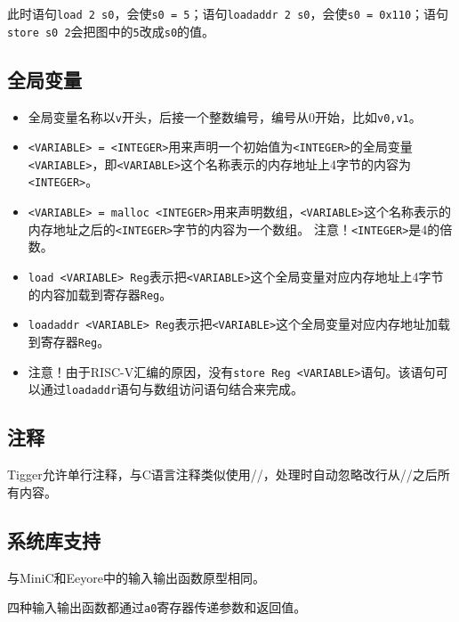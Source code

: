\documentclass{ctexart}
\begin{document}
此时语句\texttt{load 2 s0}，会使\texttt{s0 = 5}；语句\texttt{loadaddr 2 s0}，会使\texttt{s0 = 0x110}；语句\texttt{store s0 2}会把图中的\texttt{5}改成\texttt{s0}的值。

\subsection{全局变量}

\begin{itemize}
\item
全局变量名称以\texttt{v}开头，后接一个整数编号，编号从0开始，比如\texttt{v0,v1}。

\item
\texttt{<VARIABLE> = <INTEGER>}用来声明一个初始值为\texttt{<INTEGER>}的全局变量\texttt{<VARIABLE>}，即\texttt{<VARIABLE>}这个名称表示的内存地址上4字节的内容为\texttt{<INTEGER>}。

\item
\texttt{<VARIABLE> = malloc <INTEGER>}用来声明数组，\texttt{<VARIABLE>}这个名称表示的内存地址之后的\texttt{<INTEGER>}字节的内容为一个数组。
注意！\texttt{<INTEGER>}是4的倍数。


\item
\texttt{load <VARIABLE> Reg}表示把\texttt{<VARIABLE>}这个全局变量对应内存地址上4字节的内容加载到寄存器\texttt{Reg}。

\item
\texttt{loadaddr <VARIABLE> Reg}表示把\texttt{<VARIABLE>}这个全局变量对应内存地址加载到寄存器\texttt{Reg}。

\item
注意！由于RISC-V汇编的原因，没有\texttt{store Reg <VARIABLE>}语句。该语句可以通过\texttt{loadaddr}语句与数组访问语句结合来完成。
\end{itemize}

\subsection{注释}
Tigger允许单行注释，与C语言注释类似使用//，处理时自动忽略改行从//之后所有内容。

\subsection{系统库支持}
与MiniC和Eeyore中的输入输出函数原型相同。

四种输入输出函数都通过\texttt{a0}寄存器传递参数和返回值。
\end{document}
